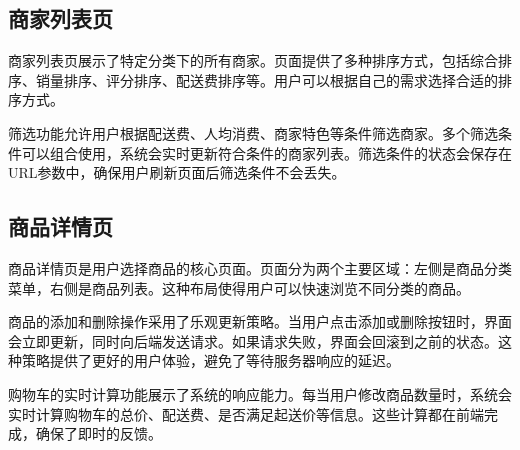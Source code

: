 \documentclass[a4paper,12pt]{article}
\begin{document}
\subsection{商家列表页}

商家列表页展示了特定分类下的所有商家。页面提供了多种排序方式，包括综合排序、销量排序、评分排序、配送费排序等。用户可以根据自己的需求选择合适的排序方式。

\begin{center}
\end{center}

筛选功能允许用户根据配送费、人均消费、商家特色等条件筛选商家。多个筛选条件可以组合使用，系统会实时更新符合条件的商家列表。筛选条件的状态会保存在URL参数中，确保用户刷新页面后筛选条件不会丢失。

\subsection{商品详情页}

商品详情页是用户选择商品的核心页面。页面分为两个主要区域：左侧是商品分类菜单，右侧是商品列表。这种布局使得用户可以快速浏览不同分类的商品。

\begin{center}
\end{center}

商品的添加和删除操作采用了乐观更新策略。当用户点击添加或删除按钮时，界面会立即更新，同时向后端发送请求。如果请求失败，界面会回滚到之前的状态。这种策略提供了更好的用户体验，避免了等待服务器响应的延迟。

购物车的实时计算功能展示了系统的响应能力。每当用户修改商品数量时，系统会实时计算购物车的总价、配送费、是否满足起送价等信息。这些计算都在前端完成，确保了即时的反馈。
\end{document}
